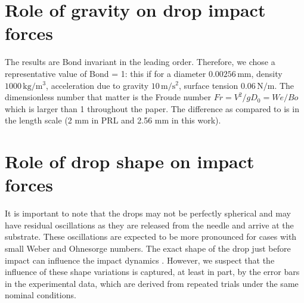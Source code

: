 \documentclass{jfm}
\begin{document}
\section{Role of gravity on drop impact forces}
\label{app:gravity}

The results are Bond invariant in the leading order. Therefore, we chose a representative value of Bond = 1: this if for a diameter $0.00256\,\si{\milli\meter}$, density $1000\,\si{\kilogram/\meter^3}$, acceleration due to gravity $10\,\si{\meter/\second^2}$, surface tension $0.06\,\si{\newton/\meter}$. The dimensionless number that matter is the Froude number $Fr = V^2/gD_0 = We/Bo$ which is larger than 1 throughout the paper. The difference as compared to \citet{zhang2022impact} is in the length scale (2 mm in PRL and 2.56 mm in this work).

\section{Role of drop shape on impact forces}
\label{app:shape}

It is important to note that the drops may not be perfectly spherical and may have residual oscillations as they are released from the needle and arrive at the substrate. These oscillations are expected to be more pronounced for cases with small Weber and Ohnesorge numbers. The exact shape of the drop just before impact can influence the impact dynamics \citep{thoraval-2013-jfm, yun2017bouncing}. However, we suspect that the influence of these shape variations is captured, at least in part, by the error bars in the experimental data, which are derived from repeated trials under the same nominal conditions.



\end{document}
